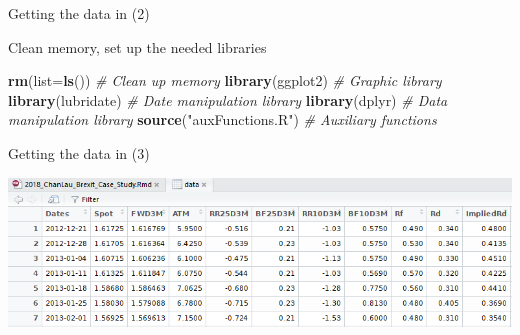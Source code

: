 \documentclass[ignorenonframetext,aspectratio=169]{beamer}
\newenvironment{Shaded}{}{}
\newcommand{\KeywordTok}[1]{\textcolor[rgb]{0.00,0.44,0.13}{\textbf{#1}}}
\newcommand{\DataTypeTok}[1]{\textcolor[rgb]{0.56,0.13,0.00}{#1}}
\newcommand{\StringTok}[1]{\textcolor[rgb]{0.25,0.44,0.63}{#1}}
\newcommand{\CommentTok}[1]{\textcolor[rgb]{0.38,0.63,0.69}{\textit{#1}}}
\newcommand{\OtherTok}[1]{\textcolor[rgb]{0.00,0.44,0.13}{#1}}
\newcommand{\OperatorTok}[1]{\textcolor[rgb]{0.40,0.40,0.40}{#1}}
\newcommand{\NormalTok}[1]{#1}
\begin{document}
\begin{frame}[fragile]{Getting the data in (2)}

Clean memory, set up the needed libraries

\begin{Shaded}
\begin{Highlighting}[]
\KeywordTok{rm}\NormalTok{(}\DataTypeTok{list=}\KeywordTok{ls}\NormalTok{())             }\CommentTok{# Clean up memory}
\KeywordTok{library}\NormalTok{(ggplot2)          }\CommentTok{# Graphic library}
\KeywordTok{library}\NormalTok{(lubridate)        }\CommentTok{# Date manipulation library}
\KeywordTok{library}\NormalTok{(dplyr)            }\CommentTok{# Data manipulation library}
\KeywordTok{source}\NormalTok{(}\StringTok{"auxFunctions.R"}\NormalTok{)  }\CommentTok{# Auxiliary functions}
\end{Highlighting}
\end{Shaded}

\end{frame}

\begin{frame}[fragile]{Getting the data in (3)}

\begin{Shaded}
\end{Shaded}

\begin{center}\includegraphics[width=1\linewidth]{images/figDataStructure} \end{center}

\end{frame}
\end{document}
